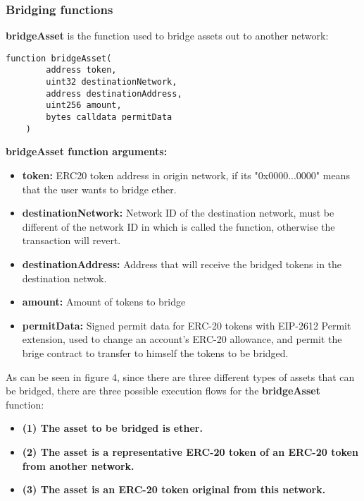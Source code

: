 \subsubsection{Bridging functions}
\textbf{bridgeAsset} is the function used to bridge assets out  to another network:

\begin{lstlisting}[language=solidity]
	function bridgeAsset(
        address token,
        uint32 destinationNetwork,
        address destinationAddress,
        uint256 amount,
        bytes calldata permitData
    )
\end{lstlisting}

\textbf{bridgeAsset function arguments:}

\begin{itemize}
	\item \textbf{token:} ERC20 token address in origin network, if its "0x0000...0000" means that the user wants to bridge ether.
	\item \textbf{destinationNetwork:} Network ID of the destination network, must be different of the network ID in which is called the function, otherwise the transaction will revert.
	\item \textbf{destinationAddress:} Address that will receive the bridged tokens in the destination netwok.
	\item \textbf{amount:} Amount of tokens to bridge
	\item \textbf{permitData:} Signed permit data for ERC-20 tokens with EIP-2612 Permit extension, used to change an account's ERC-20 allowance, and permit the brige contract to transfer to himself the tokens to be bridged.
	
\end{itemize}

As can be seen in figure 4, since there are three different types of assets that can be bridged, there are three possible execution flows for the \textbf{bridgeAsset} function:

\begin{itemize}
	\item \textbf{(1) The asset to be bridged is ether.}
	\item \textbf{(2) The asset is a representative ERC-20 token of an ERC-20 token from another network.}
	\item \textbf{(3) The asset is an ERC-20 token original from this network.}
\end{itemize}


